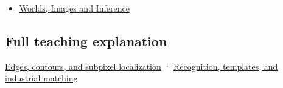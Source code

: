 \begin{itemize}
\tightlist
\item
  \href{Continuous\%20Notes/University\%20-\%20Worlds,\%20Images\%20and\%20Inference\%20-\%20Graphics,\%20Vision\%20and\%20Photography}{Worlds, Images and Inference}
\end{itemize}

\subsection{Full teaching explanation}\label{full-teaching-explanation}

\href{Continuous\%20Notes/University\%20-\%20Worlds,\%20Images\%20and\%20Inference\%20-\%20Graphics,\%20Vision\%20and\%20Photography\#Edges,\%20contours,\%20and\%20subpixel\%20localization}{Edges, contours, and subpixel localization} · \href{Continuous\%20Notes/University\%20-\%20Worlds,\%20Images\%20and\%20Inference\%20-\%20Graphics,\%20Vision\%20and\%20Photography\#Recognition,\%20templates,\%20and\%20industrial\%20matching}{Recognition, templates, and industrial matching}

